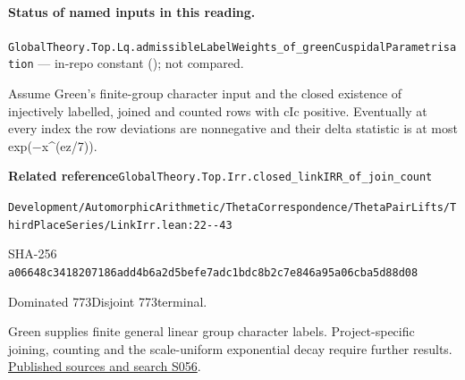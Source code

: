 

\paragraph{Status of named inputs in this reading.}
\noindent\nolinkurl{GlobalTheory.Top.Lq.admissibleLabelWeights_of_greenCuspidalParametrisation} --- in-repo constant (); not compared.\par

\begin{formalstatement}[D486]\label{decomp:D486}
Assume Green’s finite-group character input and the closed existence of injectively labelled, joined and counted rows with cIc positive. Eventually at every index the row deviations are nonnegative and their delta statistic is at most exp(\ensuremath{-}x\textasciicircum{}(ez/7)).
\end{formalstatement}
{\small\raggedright\noindent\textsf{\bfseries Related reference}\quad \nolinkurl{GlobalTheory.Top.Irr.closed_linkIRR_of_join_count}\par\noindent \nolinkurl{Development/AutomorphicArithmetic/ThetaCorrespondence/ThetaPairLifts/ThirdPlaceSeries/LinkIrr.lean:22--43}\par\noindent SHA-256 \nolinkurl{a06648c3418207186add4b6a2d5befe7adc1bdc8b2c7e846a95a06cba5d88d08}\par\noindent Dominated 773\quad Disjoint 773\quad terminal.\par}
Green supplies finite general linear group character labels. Project-specific joining, counting and the scale-uniform exponential decay require further results.
\hyperref[lit:S056]{Published sources and search S056}.
